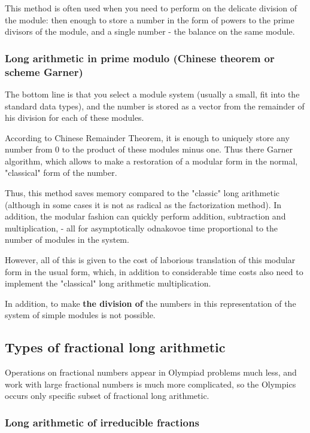 This method is often used when you need to perform on the delicate division of the module: then enough to store a number in the form of powers to the prime divisors of the module, and a single number - the balance on the same module.

\subsubsection{ Long arithmetic in prime modulo (Chinese theorem or scheme Garner) }

The bottom line is that you select a module system (usually a small, fit into the standard data types), and the number is stored as a vector from the remainder of his division for each of these modules.

According to Chinese Remainder Theorem, it is enough to uniquely store any number from 0 to the product of these modules minus one. Thus there Garner algorithm, which allows to make a restoration of a modular form in the normal, "classical" form of the number.

Thus, this method saves memory compared to the "classic" long arithmetic (although in some cases it is not as radical as the factorization method). In addition, the modular fashion can quickly perform addition, subtraction and multiplication, - all for asymptotically odnakovoe time proportional to the number of modules in the system.

However, all of this is given to the cost of laborious translation of this modular form in the usual form, which, in addition to considerable time costs also need to implement the "classical" long arithmetic multiplication.

In addition, to make \textbf{the division of} the numbers in this representation of the system of simple modules is not possible.

\subsection{ Types of fractional long arithmetic }

Operations on fractional numbers appear in Olympiad problems much less, and work with large fractional numbers is much more complicated, so the Olympics occurs only specific subset of fractional long arithmetic.

\subsubsection{ Long arithmetic of irreducible fractions }


